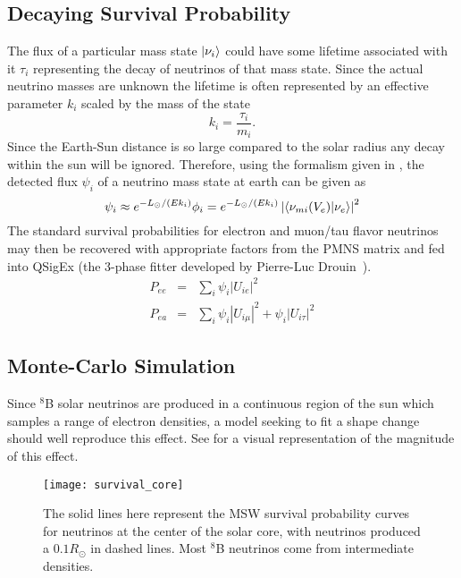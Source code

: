 \subsection{Decaying Survival Probability}

The flux of a particular mass state $\ket{\nu_i}$ could have some lifetime associated with it $\tau_i$ representing the decay of neutrinos of that mass state.
Since the actual neutrino masses are unknown the lifetime is often represented by an effective parameter $k_i$ scaled by the mass of the state
\begin{equation}
k_i = \frac{\tau_i}{m_i}.
\end{equation}
Since the Earth-Sun distance is so large compared to the solar radius any decay within the sun will be ignored. 
Therefore, using the formalism given in , the detected flux $\psi_i$ of a neutrino mass state at earth can be given as 
\begin{equation}
\psi_i \approx  e^{-L_\odot / (E k_i)} \phi_i =  e^{-L_\odot / (E k_i)} \left| \braket{\nu_{m i}(V_e)}{\nu_e} \right|^2
\label{decay}
\end{equation}
The standard survival probabilities for electron and muon/tau flavor neutrinos may then be recovered with appropriate factors from the PMNS matrix and fed into QSigEx (the 3-phase fitter developed by Pierre-Luc Drouin~\cite{plthesis}).
\begin{equation}
\begin{array}{rcl}
P_{ee} & = & \sum_i \psi_i |U_{ie}|^2  \\
P_{ea} & = & \sum_i \psi_i |U_{i\mu}|^2 + \psi_i |U_{i\tau}|^2
\end{array}
\label{survive}
\end{equation}

\subsection{Monte-Carlo Simulation}

\label{montecarlo}

Since $^8$B solar neutrinos are produced in a continuous region of the sun which samples a range of electron densities, a model seeking to fit a shape change should well reproduce this effect.
See  for a visual representation of the magnitude of this effect.

\begin{figure}
\centering
\texttt{[image: survival\_core]}
\caption{The solid lines here represent the MSW survival probability curves for neutrinos at the center of the solar core, with neutrinos produced a $0.1R_{\odot}$ in dashed lines. Most $^8$B neutrinos come from intermediate densities.}
\label{fig:core_density}
\end{figure}

